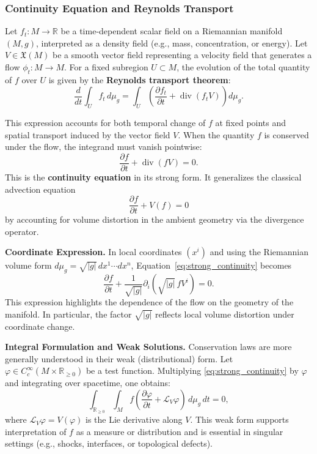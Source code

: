 \subsubsection{Continuity Equation and Reynolds Transport}
\label{subsec:continuity_reynolds}

Let $f_t : M \to \mathbb{R}$ be a time-dependent scalar field on a Riemannian manifold $(M, g)$, interpreted as a density field (e.g., mass, concentration, or energy). Let $V \in \mathfrak{X}(M)$ be a smooth vector field representing a velocity field that generates a flow $\phi_t : M \to M$. For a fixed subregion $U \subset M$, the evolution of the total quantity of $f$ over $U$ is given by the \textbf{Reynolds transport theorem}:
\begin{equation}
\label{eq:reynolds_transport}
\frac{d}{dt} \int_U f_t \, d\mu_g = \int_U \left( \frac{\partial f_t}{\partial t} + \operatorname{div}(f_t V) \right) d\mu_g.
\end{equation}

This expression accounts for both temporal change of $f$ at fixed points and spatial transport induced by the vector field $V$. When the quantity $f$ is conserved under the flow, the integrand must vanish pointwise:
\begin{equation}
\label{eq:strong_continuity}
\frac{\partial f}{\partial t} + \operatorname{div}(f V) = 0.
\end{equation}
This is the \textbf{continuity equation} in its strong form. It generalizes the classical advection equation
\[
\frac{\partial f}{\partial t} + V(f) = 0
\]
by accounting for volume distortion in the ambient geometry via the divergence operator.

\textbf{Coordinate Expression.} In local coordinates $(x^i)$ and using the Riemannian volume form $d\mu_g = \sqrt{|g|} \, dx^1 \cdots dx^n$, Equation~\eqref{eq:strong_continuity} becomes
\begin{equation}
\label{eq:local_continuity}
\frac{\partial f}{\partial t} + \frac{1}{\sqrt{|g|}} \partial_i\left( \sqrt{|g|} \, f V^i \right) = 0.
\end{equation}
This expression highlights the dependence of the flow on the geometry of the manifold. In particular, the factor $\sqrt{|g|}$ reflects local volume distortion under coordinate change.

\textbf{Integral Formulation and Weak Solutions.} Conservation laws are more generally understood in their weak (distributional) form. Let $\varphi \in C_c^\infty(M \times \mathbb{R}_{\geq 0})$ be a test function. Multiplying \eqref{eq:strong_continuity} by $\varphi$ and integrating over spacetime, one obtains:
\begin{equation}
\label{eq:weak_continuity}
\int_{\mathbb{R}_{\geq 0}} \int_M f \left( \frac{\partial \varphi}{\partial t} + \mathcal{L}_V \varphi \right) \, d\mu_g \, dt = 0,
\end{equation}
where $\mathcal{L}_V \varphi = V(\varphi)$ is the Lie derivative along $V$. This weak form supports interpretation of $f$ as a measure or distribution and is essential in singular settings (e.g., shocks, interfaces, or topological defects).

